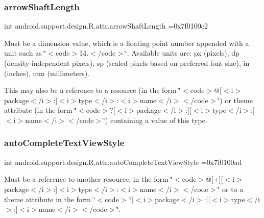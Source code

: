 \subsubsection{\texorpdfstring{arrow\+Shaft\+Length}{arrowShaftLength}}
{\footnotesize\ttfamily int android.\+support.\+design.\+R.\+attr.\+arrow\+Shaft\+Length =0x7f0100c2\hspace{0.3cm}{\ttfamily [static]}}

Must be a dimension value, which is a floating point number appended with a unit such as \char`\"{}$<$code$>$14.\+5sp$<$/code$>$\char`\"{}. Available units are\+: px (pixels), dp (density-\/independent pixels), sp (scaled pixels based on preferred font size), in (inches), mm (millimeters). 

This may also be a reference to a resource (in the form \char`\"{}$<$code$>$@\mbox{[}$<$i$>$package$<$/i$>$\+:\mbox{]}$<$i$>$type$<$/i$>$\+:$<$i$>$name$<$/i$>$$<$/code$>$\char`\"{}) or theme attribute (in the form \char`\"{}$<$code$>$?\mbox{[}$<$i$>$package$<$/i$>$\+:\mbox{]}\mbox{[}$<$i$>$type$<$/i$>$\+:\mbox{]}$<$i$>$name$<$/i$>$$<$/code$>$\char`\"{}) containing a value of this type. \mbox{\label{classandroid_1_1support_1_1design_1_1R_1_1attr_aac0df944af42113f0bd554f81b7c03f4}} 
\subsubsection{\texorpdfstring{auto\+Complete\+Text\+View\+Style}{autoCompleteTextViewStyle}}
{\footnotesize\ttfamily int android.\+support.\+design.\+R.\+attr.\+auto\+Complete\+Text\+View\+Style =0x7f0100ad\hspace{0.3cm}{\ttfamily [static]}}

Must be a reference to another resource, in the form \char`\"{}$<$code$>$@\mbox{[}+\mbox{]}\mbox{[}$<$i$>$package$<$/i$>$\+:\mbox{]}$<$i$>$type$<$/i$>$\+:$<$i$>$name$<$/i$>$$<$/code$>$\char`\"{} or to a theme attribute in the form \char`\"{}$<$code$>$?\mbox{[}$<$i$>$package$<$/i$>$\+:\mbox{]}\mbox{[}$<$i$>$type$<$/i$>$\+:\mbox{]}$<$i$>$name$<$/i$>$$<$/code$>$\char`\"{}. \mbox{\label{classandroid_1_1support_1_1design_1_1R_1_1attr_aeb618e21eef4362611649c7ca5a38343}} 
